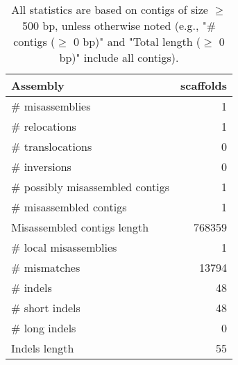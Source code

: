 \documentclass[12pt,a4paper]{article}
\begin{document}
\begin{table}[ht]
\begin{center}
\caption{All statistics are based on contigs of size $\geq$ 500 bp, unless otherwise noted (e.g., "\# contigs ($\geq$ 0 bp)" and "Total length ($\geq$ 0 bp)" include all contigs).}
\begin{tabular}{|l*{1}{|r}|}
\hline
Assembly & scaffolds \\ \hline
\# misassemblies & 1 \\ \hline
\hspace{5mm}\# relocations & 1 \\ \hline
\hspace{5mm}\# translocations & 0 \\ \hline
\hspace{5mm}\# inversions & 0 \\ \hline
\# possibly misassembled contigs & 1 \\ \hline
\# misassembled contigs & 1 \\ \hline
Misassembled contigs length & 768359 \\ \hline
\# local misassemblies & 1 \\ \hline
\# mismatches & 13794 \\ \hline
\# indels & 48 \\ \hline
\hspace{5mm}\# short indels & 48 \\ \hline
\hspace{5mm}\# long indels & 0 \\ \hline
Indels length & 55 \\ \hline
\end{tabular}
\end{center}
\end{table}
\end{document}
